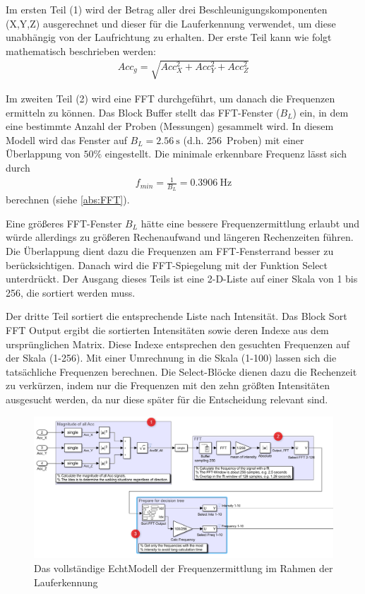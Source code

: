 Im ersten Teil (1) wird der Betrag aller drei Beschleunigungskomponenten (X,Y,Z) ausgerechnet und dieser für die Lauferkennung verwendet, um diese unabhängig von der Laufrichtung zu erhalten. Der erste Teil kann wie folgt mathematisch beschrieben werden:
\begin{align*}
	Acc_g = \sqrt{ Acc_X^2 + Acc_Y^2 + Acc_Z^2}
\end{align*}

Im zweiten Teil (2) wird eine FFT durchgeführt, um danach die Frequenzen ermitteln zu können. Das Block \glqq Buffer\grqq{} stellt das FFT-Fenster ($B_L$) ein, in dem eine bestimmte Anzahl der Proben (Messungen) gesammelt wird. In diesem Modell wird das Fenster auf $B_L = \SI{2,56}{\second}$ (d.h. \SI{256}{Proben}) mit einer Überlappung von $50\%$ eingestellt. Die minimale erkennbare Frequenz lässt sich durch
\begin{align*}
	f_{min} = \frac{1}{B_L} = \SI{0,3906}{\hertz}
\end{align*}
berechnen (siehe \autoref{abs:FFT}).

Eine größeres FFT-Fenster $B_L$ hätte eine bessere Frequenzermittlung erlaubt und würde allerdings zu größeren Rechenaufwand und längeren Rechenzeiten führen. Die Überlappung dient dazu die Frequenzen am FFT-Fensterrand besser zu berücksichtigen. Danach wird die FFT-Spiegelung mit der Funktion \glqq Select\grqq{} unterdrückt. Der Ausgang dieses Teils ist eine 2-D-Liste auf einer Skala von 1 bis 256, die sortiert werden muss.

Der dritte Teil sortiert die entsprechende Liste nach Intensität. Das Block \glqq Sort FFT Output\grqq{} ergibt die sortierten Intensitäten sowie deren Indexe aus dem ursprünglichen Matrix. Diese Indexe entsprechen den gesuchten Frequenzen auf der Skala (1-256). Mit einer Umrechnung in die Skala (1-100) lassen sich die tatsächliche Frequenzen berechnen. Die \glqq Select\grqq{}-Blöcke dienen dazu die Rechenzeit zu verkürzen, indem nur die Frequenzen mit den zehn größten Intensitäten ausgesucht werden, da nur diese später für die Entscheidung relevant sind.

\begin{figure}
	\centering
	\includegraphics[width=\linewidth]{Bilder/Lauferkennung_Modell_1_1.png}
	\caption{Das vollständige EchtModell der Frequenzermittlung im Rahmen der Lauferkennung}
	\label{fig:Lauferkennung_Freqbasiert_FFT_Echtmodell}
\end{figure}

